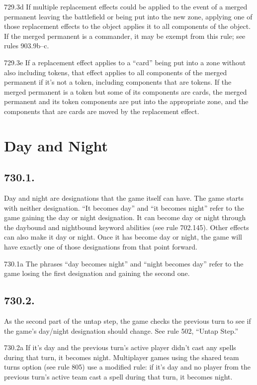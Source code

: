 729.3d If multiple replacement effects could be applied to the event of a merged permanent leaving the battlefield or being put into the new zone, applying one of those replacement effects to the object applies it to all components of the object. If the merged permanent is a commander, it may be exempt from this rule; see rules 903.9b–c.

729.3e If a replacement effect applies to a “card” being put into a zone without also including tokens, that effect applies to all components of the merged permanent if it’s not a token, including components that are tokens. If the merged permanent is a token but some of its components are cards, the merged permanent and its token components are put into the appropriate zone, and the components that are cards are moved by the replacement effect.

\section{Day and Night}
\subsection*{730.1.}
Day and night are designations that the game itself can have. The game starts with neither designation. “It becomes day” and “it becomes night” refer to the game gaining the day or night designation. It can become day or night through the daybound and nightbound keyword abilities (see rule 702.145). Other effects can also make it day or night. Once it has become day or night, the game will have exactly one of those designations from that point forward.

730.1a The phrases “day becomes night” and “night becomes day” refer to the game losing the first designation and gaining the second one.

\subsection*{730.2.}
As the second part of the untap step, the game checks the previous turn to see if the game’s day/night designation should change. See rule 502, “Untap Step.”

730.2a If it’s day and the previous turn’s active player didn’t cast any spells during that turn, it becomes night. Multiplayer games using the shared team turns option (see rule 805) use a modified rule: if it’s day and no player from the previous turn’s active team cast a spell during that turn, it becomes night.

